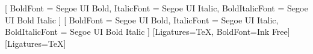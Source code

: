%      
%


\usepackage{fontspec}
\setsansfont{Segoe UI}[
  BoldFont       = {Segoe UI Bold},
  ItalicFont     = {Segoe UI Italic},
  BoldItalicFont = {Segoe UI Bold Italic}
]
\setmainfont{Segoe UI}[
  BoldFont       = {Segoe UI Bold},
  ItalicFont     = {Segoe UI Italic},
  BoldItalicFont = {Segoe UI Bold Italic}
]
\setmonofont{Consolas}
\newfontfamily{}[Ligatures=TeX, BoldFont={Ink Free}]
\newfontfamily{}[Ligatures=TeX]

